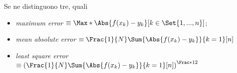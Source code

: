 \documentclass{subfiles}
\begin{document}
Se ne distinguono tre, quali
\begin{itemize}
    \item \emph{maximum error} \(\equiv \Max*{\Abs{f(x_{k}) - y_{k}}}[k \in \Set{1, ..., n}]\);
    \item \emph{mean absolute error} \(\equiv \Frac{1}{N} \Sum{\Abs{f(x_{k}) - y_{k}}}{k = 1}[n]\)
    \item \emph{least square error} \(\equiv \left( \Frac{1}{N} \Sum{\Abs{f(x_{k}) - y_{k}}}{k = 1}[n] \right)^{\Frac*{1}{2}} \)
\end{itemize}
\end{document}
